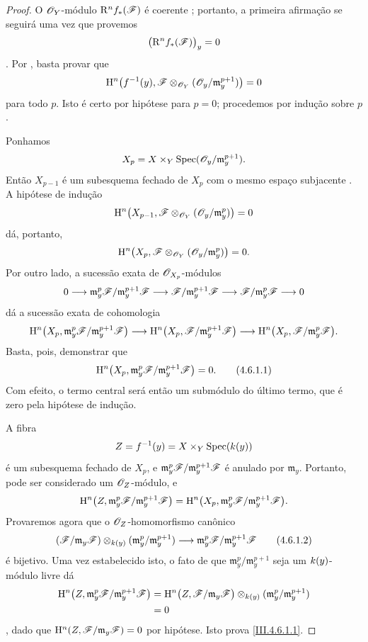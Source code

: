 \begin{proof}
O $\mathscr{O}_Y$-módulo $\mathrm{R}^n f_*(\mathscr{F})$ é coerente
; portanto, a primeira afirmação se seguirá uma vez que provemos
\[
  \bigl(\mathrm{R}^n f_*(\mathscr{F})\bigr)_y=0
\]
. Por , basta provar que
\[
  \mathrm{H}^n\bigl(f^{-1}(y),
    \mathscr{F}\otimes_{\mathscr{O}_Y}
      (\mathscr{O}_y/\mathfrak m_y^{p+1})\bigr)=0
\]
para todo $p$. Isto é certo por hipótese para $p=0$; procedemos por
indução sobre $p$.

Ponhamos
\[
  X_p=X\times_Y
    \operatorname{Spec}(\mathscr{O}_y/\mathfrak m_y^{p+1}).
\]
Então $X_{p-1}$ é um subesquema fechado de $X_p$ com o mesmo
espaço subjacente . A hipótese de indução
\[
  \mathrm{H}^n\bigl(X_{p-1},
    \mathscr{F}\otimes_{\mathscr{O}_Y}
      (\mathscr{O}_y/\mathfrak m_y^p)\bigr)=0
\]
dá, portanto,
\[
  \mathrm{H}^n\bigl(X_p,
    \mathscr{F}\otimes_{\mathscr{O}_Y}
      (\mathscr{O}_y/\mathfrak m_y^p)\bigr)=0.
\]
Por outro lado, a sucessão exata de $\mathscr{O}_{X_p}$-módulos
\[
  0\longrightarrow
  \mathfrak m_y^p\mathscr{F}/\mathfrak m_y^{p+1}\mathscr{F}
  \longrightarrow
  \mathscr{F}/\mathfrak m_y^{p+1}\mathscr{F}
  \longrightarrow
  \mathscr{F}/\mathfrak m_y^p\mathscr{F}
  \longrightarrow0
\]
dá a sucessão exata de cohomologia
\[
  \mathrm{H}^n\bigl(X_p,
    \mathfrak m_y^p\mathscr{F}/\mathfrak m_y^{p+1}\mathscr{F}\bigr)
  \longrightarrow
  \mathrm{H}^n\bigl(X_p,\mathscr{F}/\mathfrak m_y^{p+1}\mathscr{F}\bigr)
  \longrightarrow
  \mathrm{H}^n\bigl(X_p,\mathscr{F}/\mathfrak m_y^p\mathscr{F}\bigr).
\]
Basta, pois, demonstrar que
\[
\label{III.4.6.1.1}
  \HH^n\bigl(X_p,
    \mathfrak m_y^p\sh{F}/\mathfrak m_y^{p+1}\sh{F}\bigr)=0.
  \tag{4.6.1.1}
\]
Com efeito, o termo central será então um submódulo do último termo,
que é zero pela hipótese de indução.


A fibra
\[
  Z=f^{-1}(y)=X\times_Y\operatorname{Spec}(k(y))
\]
é um subesquema fechado de $X_p$, e
$\mathfrak m_y^p\mathscr{F}/\mathfrak m_y^{p+1}\mathscr{F}$ é anulado por
$\mathfrak m_y$. Portanto, pode ser considerado um
$\mathscr{O}_Z$-módulo, e
\[
  \mathrm{H}^n\bigl(Z,
    \mathfrak m_y^p\mathscr{F}/\mathfrak m_y^{p+1}\mathscr{F}\bigr)
  =
  \mathrm{H}^n\bigl(X_p,
    \mathfrak m_y^p\mathscr{F}/\mathfrak m_y^{p+1}\mathscr{F}\bigr).
\]
Provaremos agora que o $\mathscr{O}_Z$-homomorfismo canônico
\[
\label{III.4.6.1.2}
  (\sh{F}/\mathfrak m_y\sh{F})
    \otimes_{\kres(y)}
      (\mathfrak m_y^p/\mathfrak m_y^{p+1})
  \longrightarrow
  \mathfrak m_y^p\sh{F}/\mathfrak m_y^{p+1}\sh{F}
  \tag{4.6.1.2}
\]
é bijetivo. Uma vez estabelecido isto, o fato de que
$\mathfrak m_y^p/\mathfrak m_y^{p+1}$ seja um
$k(y)$-módulo livre dá
\[
\begin{split}
  \mathrm{H}^n\bigl(Z,
    \mathfrak m_y^p\mathscr{F}/\mathfrak m_y^{p+1}\mathscr{F}\bigr)
  &=
  \mathrm{H}^n\bigl(Z,\mathscr{F}/\mathfrak m_y\mathscr{F}\bigr)
    \otimes_{k(y)}
      (\mathfrak m_y^p/\mathfrak m_y^{p+1})\\
  &=0
\end{split}
\]
, dado que
$\mathrm{H}^n(Z,\mathscr{F}/\mathfrak m_y\mathscr{F})=0$ por hipótese. Isto prova
\eqref{III.4.6.1.1}.


\end{proof}
